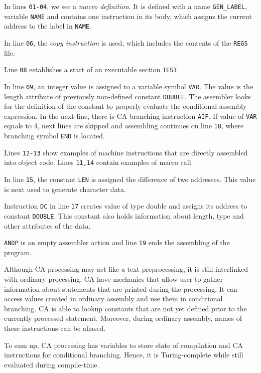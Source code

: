 In lines \verb|01-04|, we see a \emph{macro definition}. It is defined with a name \verb|GEN_LABEL|, variable \verb|NAME| and contains one instruction in its body, which assigns the current address to the label in \verb|NAME|.

In line \verb|06|, the \emph{copy instruction} is used, which includes the contents of the \verb|REGS| file.

Line \verb|08| establishes a start of an executable section \verb|TEST|. 

In line \verb|09|, an integer value is assigned to a variable symbol \verb|VAR|. The value is the length attribute of previously non-defined constant \verb|DOUBLE|. The assembler looks for the definition of the constant to properly evaluate the conditional assembly expression. In the next line, there is CA branching instruction \verb|AIF|. If value of \verb|VAR| equals to 4, next lines are skipped and assembling continues on line \verb|18|, where branching symbol \verb|END| is located.  

Lines \verb|12-13| show examples of machine instructions that are directly assembled into object code. Lines \verb|11,14| contain examples of macro call.

In line \verb|15|, the constant \verb|LEN| is assigned the difference of two addresses. This value is next used to generate character data.

Instruction \verb|DC| in line \verb|17| creates value of type double and assigns its address to constant \verb|DOUBLE|. This constant also holds information about length, type and other attributes of the data.  

\verb|ANOP| is an empty assembler action and line \verb|19| ends the assembling of the program. 

\vspace{5mm}

Although CA processing may act like a text preprocessing, it is still interlinked with ordinary processing. CA have mechanics that allow user to gather information about statements that are printed during the processing. It can access values created in ordinary assembly and use them in conditional branching. CA is able to lookup constants that are not yet defined prior to the currently processed statement. Moreover, during ordinary assembly, names of these instructions can be aliased.

To sum up, CA processing has variables to store state of compilation and CA instructions for conditional branching. Hence, it is Turing-complete while still evaluated during compile-time.


